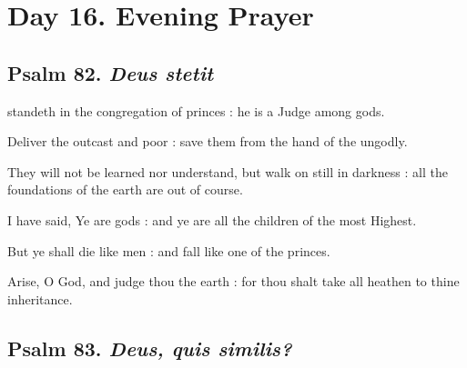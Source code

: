 \section*{Day 16. Evening Prayer}

\subsection{Psalm 82. \textit{Deus stetit}}

 standeth in the congregation of princes : he is a Judge among gods.\par
{}
Deliver the outcast and poor : save them from the hand of the ungodly.\par
{}They will not be learned nor understand, but walk on still in darkness : all the foundations of the earth are out of course.\par
{}I have said, Ye are gods : and ye are all the children of the most Highest.\par
{}But ye shall die like men : and fall like one of the princes.\par
{}Arise, O God, and judge thou the earth : for thou shalt take all heathen to thine inheritance.\par

\clearpage
\subsection{Psalm 83. \textit{Deus, quis similis?}}

